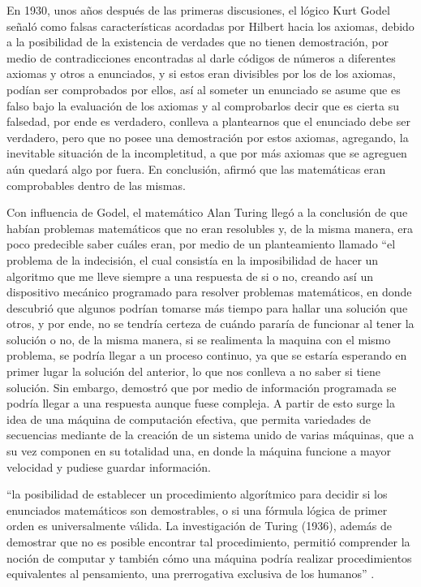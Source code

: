\documentclass[12pt]{article}
\begin{document}
\vspace{15PT}
En 1930, unos años después de las primeras discusiones, el lógico Kurt Godel  señaló como falsas características acordadas por Hilbert hacia los axiomas, debido a la posibilidad de la existencia de verdades que no tienen demostración, por medio de contradicciones encontradas al darle códigos de números a diferentes axiomas y otros a enunciados, y si estos eran divisibles por los de los axiomas, podían ser comprobados por ellos, así al someter un enunciado se asume que es falso bajo la evaluación de los axiomas y al comprobarlos decir que es cierta su falsedad, por ende es verdadero, conlleva a plantearnos que el enunciado debe ser verdadero, pero que no posee una demostración por estos axiomas,  agregando, la inevitable situación de la incompletitud, a que por más axiomas que se agreguen aún quedará algo por fuera. En conclusión, afirmó que las matemáticas eran comprobables dentro de las mismas.

\vspace{15PT}
Con influencia de Godel, el matemático Alan Turing llegó a la conclusión de que habían problemas matemáticos que no eran resolubles y, de la misma manera, era poco predecible saber cuáles eran, por medio de un planteamiento llamado “el problema de la indecisión, el cual consistía en la imposibilidad de hacer un algoritmo que me lleve siempre a una respuesta de si o no, creando así un dispositivo mecánico programado para resolver problemas matemáticos, en donde descubrió que algunos podrían tomarse más tiempo para hallar una solución que otros, y por ende, no se tendría certeza de cuándo pararía de funcionar al tener la solución o no, de la misma manera, si se realimenta la maquina con el mismo problema, se podría llegar a un proceso continuo, ya que se estaría esperando en primer lugar la solución del anterior, lo que nos conlleva a no saber si tiene solución. Sin embargo, demostró que por medio de información programada se podría llegar a una respuesta aunque fuese compleja. A partir de esto surge la idea de una máquina de computación efectiva, que permita variedades de secuencias mediante de la creación de un sistema unido de varias máquinas, que a su vez componen en su totalidad una, en donde la máquina funcione a mayor velocidad y pudiese guardar información.
\vspace{15PT}

``la posibilidad de establecer un procedimiento algorítmico para decidir si los enunciados matemáticos son demostrables, o si una fórmula lógica de primer orden es universalmente válida. La investigación de Turing (1936), además de demostrar que no es posible encontrar tal procedimiento, permitió comprender la noción de computar y también cómo una máquina podría realizar procedimientos equivalentes al pensamiento, una prerrogativa exclusiva de los humanos'' \cite{gonzalez2011maquinas}.
\end{document}
